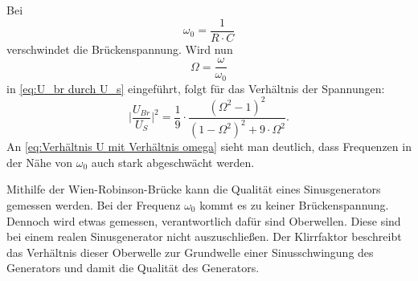 Bei 
\begin{equation}
    \omega_0 = \frac{1}{R \cdot C}
\end{equation}
verschwindet die Brückenspannung.
Wird nun
\begin{equation}
    \Omega = \frac{\omega}{\omega_0}
\end{equation}
in \eqref{eq:U_br durch U_s} eingeführt, folgt für das Verhältnis der Spannungen:
\begin{equation}
    \label{eq:Verhältnis U mit Verhältnis omega}
    \lvert{\frac{U_{Br}}{U_S}}\rvert^2 = \frac{1}{9} \cdot \frac{(\Omega^2 - 1)^2}{(1 - \Omega^2)^2 + 9 \cdot \Omega^2} .
\end{equation}
An \eqref{eq:Verhältnis U mit Verhältnis omega} sieht man deutlich, dass Frequenzen in der Nähe von $\omega_0$ auch stark abgeschwächt werden.

Mithilfe der Wien-Robinson-Brücke kann die Qualität eines Sinusgenerators gemessen werden.
Bei der Frequenz $\omega_0$ kommt es zu keiner Brückenspannung.
Dennoch wird etwas gemessen, verantwortlich dafür sind Oberwellen.
Diese sind bei einem realen Sinusgenerator nicht auszuschließen.
Der Klirrfaktor beschreibt das Verhältnis dieser Oberwelle zur Grundwelle einer Sinusschwingung des Generators
und damit die Qualität des Generators.